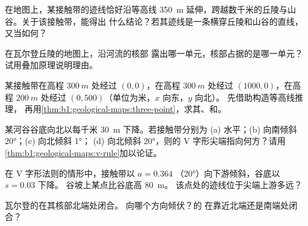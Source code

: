 \begin{exercise}[$\star$]\label{exo:b1:geological-maps:3}
在地图上，某接触带的迹线恰好沿等高线 \qty{350}{m}
延伸，跨越数千米的丘陵与山谷。关于该接触带，能得出
什么结论？若其迹线是一条横穿丘陵和山谷的直线，
又当如何？
\end{exercise}

\begin{exercise}[$\star$]\label{exo:b1:geological-maps:4}
在瓦尔登丘陵的地图上，沿河流的核部
露出哪一单元，核部占据的是哪一单元？
试用叠加原理说明理由。
\end{exercise}

\begin{exercise}[$\star\star$]\label{exo:b1:geological-maps:5}
某接触带在高程 $\qty{300}{m}$ 处经过 $(0, 0)$，在高程 $\qty{300}{m}$
处经过 $(1000, 0)$，在高程 $\qty{200}{m}$ 处经过 $(0, 500)$（单位为米，$x$ 向东，$y$ 向北）。
先借助构造等高线推理，
再用\cref{thm:b1:geological-maps:three-point}，求其、和。
\end{exercise}

\begin{exercise}[$\star\star$]\label{exo:b1:geological-maps:6}
某河谷谷底向北以每千米 \qty{30}{m} 下降。若接触带分别为
(a) 水平；(b) 向南倾斜 \ang{20}；(c) 向北倾斜 \ang{1}；
(d) 向北倾斜 \ang{20}，则的 V 字形尖端指向何方？请用
\cref{thm:b1:geological-maps:v-rule}加以论证。
\end{exercise}

\begin{exercise}[$\star\star$]\label{exo:b1:geological-maps:7}
在 V 字形法则的情形中，接触带以 $a = 0.364$
（\ang{20}）向下游倾斜，谷底以 $s = 0.03$ 下降。
谷坡上某点比谷底高 \qty{80}{m}。
该点处的迹线位于尖端上游多远？
\end{exercise}

\begin{exercise}[$\star\star$]\label{exo:b1:geological-maps:8}
瓦尔登的在其核部北端处闭合。
向哪个方向倾伏？的
在靠近北端还是南端处闭合？
\end{exercise}

